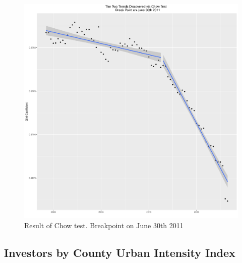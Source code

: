 \begin{figure}[h]
	\centering
	\includegraphics[width=1\textwidth]{Figures/ChapterIII/ChowTest.pdf}
	\caption[Chow Test Result]{Result of Chow test.  Breakpoint on June 30th 2011}
	\label{fig:Chow Test}
\end{figure}

\subsection{Investors by County Urban Intensity Index}

